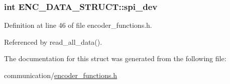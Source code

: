 \hypertarget{structENC__DATA__STRUCT_a93b8e925392a12a8874bf59f2a1cd76a}{
\subsubsection[{spi\-\_\-dev}]{\setlength{\rightskip}{0pt plus 5cm}int E\-N\-C\-\_\-\-D\-A\-T\-A\-\_\-\-S\-T\-R\-U\-C\-T\-::spi\-\_\-dev}}\label{structENC__DATA__STRUCT_a93b8e925392a12a8874bf59f2a1cd76a}


Definition at line 46 of file encoder\-\_\-functions.\-h.



Referenced by read\-\_\-all\-\_\-data().



The documentation for this struct was generated from the following file\-:\begin{DoxyCompactItemize}
\item 
communication/\hyperlink{encoder__functions_8h}{encoder\-\_\-functions.\-h}\end{DoxyCompactItemize}
